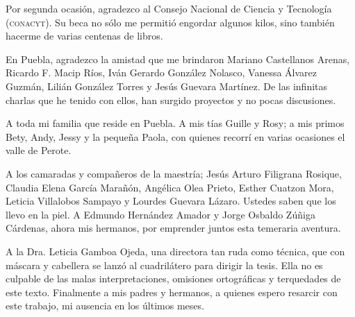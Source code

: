 \documentclass[14pt,twoside,final]{extbook} %
\providecommand\phantomsection{} %
\begin{document}
Por segunda ocasión, agradezco al Consejo Nacional de Ciencia y Tecnología (\textsc{conacyt}). Su beca no sólo me permitió engordar algunos kilos, sino también hacerme de varias centenas de libros.

En Puebla, agradezco la amistad que me brindaron Mariano Castellanos Arenas, Ricardo F. Macip Ríos, Iván Gerardo González Nolasco, Vanessa Álvarez Guzmán, Lilián González Torres y Jesús Guevara Martínez. De las infinitas charlas que he tenido con ellos, han surgido proyectos y no pocas discusiones.

A toda mi familia que reside en Puebla. A mis tías Guille y Rosy; a mis primos Bety, Andy, Jessy y la pequeña Paola, con quienes recorrí en varias ocasiones el valle de Perote.

A los camaradas y compañeros de la maestría; Jesús Arturo Filigrana Rosique, Claudia Elena García Marañón, Angélica Olea Prieto, Esther Cuatzon Mora, Leticia Villalobos Sampayo y Lourdes Guevara Lázaro. Ustedes saben que los llevo en la piel. A Edmundo Hernández Amador y Jorge Osbaldo Zúñiga Cárdenas, ahora mis hermanos, por emprender juntos esta temeraria aventura.

A la Dra. Leticia Gamboa Ojeda, una directora tan ruda como técnica, que con máscara y cabellera se lanzó al cuadrilátero para dirigir la tesis. Ella no es culpable de las malas interpretaciones, omisiones ortográficas y terquedades de este texto. Finalmente a mis padres y hermanos, a quienes espero resarcir con este trabajo, mi ausencia en los últimos meses.
\cleardoublepage
\makeatletter
\renewcommand\@dotsep{200} %
\makeatother
\renewcommand{\contentsname}{Índice de contenidos}
\thispagestyle{empty}
\pagestyle{fancy}
\fancyhf{} %
\fancyhead[LE,RO]{\thepage}
\fancyfoot{}
\renewcommand{\headrulewidth}{0pt}
\protect\phantomsection
{}
\tableofcontents
{}
\cleardoublepage
\makeatletter
\renewcommand\@dotsep{200} %
\makeatother
\renewcommand{\listtablename}{Índice de cuadros}
\listoftables
{}
\thispagestyle{empty}
\pagestyle{fancy}
\fancyhf{} %
\fancyhead[RO,LE]{\thepage}
\fancyfoot{}
\renewcommand{\headrulewidth}{0pt}
\makeatletter
\renewcommand\@dotsep{200} %
\makeatother
\renewcommand{\listfigurename}{Índice de imágenes}
\listoffigures
{}
\thispagestyle{empty}
\pagestyle{fancy}
\fancyhf{} %
\fancyhead[RO,LE]{\thepage}
\fancyfoot{}
\renewcommand{\headrulewidth}{0pt}
\end{document}
